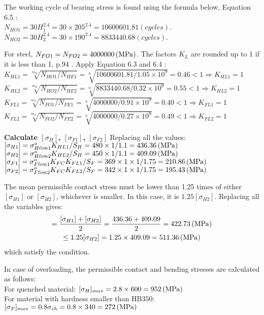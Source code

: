 The working cycle of bearing stress is found using the formula below, Equation 6.5 \cite{tk1}:\\
$ N_{HO1} = 30H_1^{2.4} = 30\times 205^{2.4} = 10600601.81\unit{(cycles)}$.\\
$ N_{HO2} = 30H_2^{2.4} = 30\times 190^{2.4} = 8833440.68\unit{(cycles)}$.

For steel, $ N_{FO1}= N_{FO2}= 4000000\, (\mathrm{MPa})$. The factors $ K_L $ are rounded up to 1 if it is less than 1, p.94 \cite{tk1}. Apply Equation 6.3 and 6.4 \cite{tk1}:\\
$ K_{HL1} = \sqrt[m_H]{N_{HO1}/N_{HE1}} = \sqrt[6]{10600601.81/1.05 \times10^9} = 0.46 < 1 \Rightarrow K_{HL1} = 1$\\
$ K_{HL2} = \sqrt[m_H]{N_{HO2}/N_{HE2}} = \sqrt[6]{8833440.68/0.32 \times10^9} = 0.55 < 1 \Rightarrow K_{HL2} = 1$\\
$ K_{FL1} = \sqrt[m_F]{N_{FO1}/N_{FE1}} = \sqrt[6]{4000000/0.91 \times10^9} = 0.40 < 1 \Rightarrow K_{FL1} = 1$\\
$ K_{FL2} = \sqrt[m_F]{N_{FO2}/N_{FE2}} = \sqrt[6]{4000000/0.27 \times10^9} = 0.49 < 1 \Rightarrow K_{FL2} = 1$

\textbf{Calculate $ [\sigma_H] $, $ [\sigma_{F1}] $, $ [\sigma_{F2}] $} Replacing all the values:\\
$ [\sigma_{H1}] = \sigma_{Hlim1}^oK_{HL1}/S_H = 480\times 1/1.1 = 436.36 \, (\mathrm{MPa})$\\
$ [\sigma_{H2}] = \sigma_{Hlim2}^oK_{HL2}/S_H = 450\times 1/1.1 = 409.09 \, (\mathrm{MPa})$\\
$ [\sigma_{F1}] = \sigma_{Flim1}^oK_{FC}K_{FL1}/S_{F} = 369\times 1\times 1/1.75  = 210.86\, (\mathrm{MPa})$\\
$ [\sigma_{F2}] = \sigma_{Flim2}^oK_{FC}K_{FL2}/S_{F} = 342\times 1\times 1/1.75  = 195.43 \, (\mathrm{MPa})$

The mean permissible contact stress must be lower than 1.25 times of either $ [\sigma_{H1}] $ or $ [\sigma_{H2}] $, whichever is smaller. In this case, it is $ 1.25[\sigma_{H2}]$. Replacing all the variables gives:
\begin{multline*}
	[\sigma_H] =\dfrac{[\sigma_{H1}]+[\sigma_{H2}]}{2}= \dfrac{436.36+409.09}{2} = 422.73 \unitp{MPa}\\
	\leq 1.25[\sigma_{H2}] = 1.25\times 409.09= 511.36\unitp{MPa}
\end{multline*}
which satisfy the condition.

In case of overloading, the permissible contact and bending stresses are calculated as follows:\\
For quenched material: $ [\sigma_H]_{max} = 2.8\times 600 = 952\, (\mathrm{MPa}) $\\
For material with hardness smaller than $ \text{HB}350 $: $ [\sigma_F]_{max} = 0.8\sigma_{ch} = 0.8\times 340 = 272\, (\mathrm{MPa}) $

